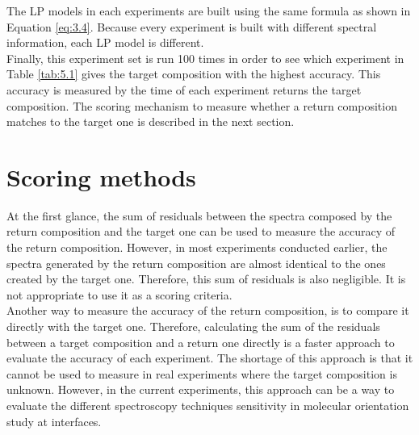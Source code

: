 The LP models in each experiments are built using the same formula as shown in Equation \ref{eq:3.4}. Because every experiment is built with different spectral information, each LP model is different. \\

Finally, this experiment set is run 100 times in order to see which experiment in Table \ref{tab:5.1} gives the target composition with the highest accuracy. This accuracy is measured by the time of each experiment returns the target composition. The scoring mechanism to measure whether a return composition matches to the target one is described in the next section. \\

\section{Scoring methods}

At the first glance, the sum of residuals between the spectra composed by the return composition and the target one can be used to measure the accuracy of the return composition. However, in most experiments conducted earlier, the spectra generated by the return composition are almost identical to the ones created by the target one. Therefore, this sum of residuals is also negligible. It is not appropriate to use it as a scoring criteria. \\

Another way to measure the accuracy of the return composition, is to compare it directly with the target one. Therefore, calculating the sum of the residuals between a target composition and a return one directly is a faster approach to evaluate the accuracy of each experiment. The shortage of this approach is that it cannot be used to measure in real experiments where the target composition is unknown. However, in the current experiments, this approach can be a way to evaluate the different spectroscopy techniques sensitivity in molecular orientation study at interfaces. \\




